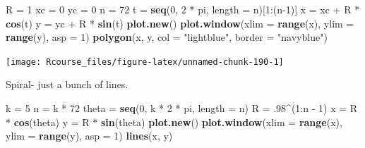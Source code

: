 \documentclass[]{book}
\newenvironment{Shaded}{\begin{snugshade}}{\end{snugshade}}
\newcommand{\KeywordTok}[1]{\textcolor[rgb]{0.13,0.29,0.53}{\textbf{{#1}}}}
\newcommand{\DataTypeTok}[1]{\textcolor[rgb]{0.13,0.29,0.53}{{#1}}}
\newcommand{\DecValTok}[1]{\textcolor[rgb]{0.00,0.00,0.81}{{#1}}}
\newcommand{\StringTok}[1]{\textcolor[rgb]{0.31,0.60,0.02}{{#1}}}
\newcommand{\NormalTok}[1]{{#1}}
\theoremstyle{definition}
\theoremstyle{definition}
\theoremstyle{remark}
\begin{document}
\begin{Shaded}
\begin{Highlighting}[]
\NormalTok{R =}\StringTok{ }\DecValTok{1}
\NormalTok{xc =}\StringTok{ }\DecValTok{0}
\NormalTok{yc =}\StringTok{ }\DecValTok{0}
\NormalTok{n =}\StringTok{ }\DecValTok{72}
\NormalTok{t =}\StringTok{ }\KeywordTok{seq}\NormalTok{(}\DecValTok{0}\NormalTok{, }\DecValTok{2} \NormalTok{*}\StringTok{ }\NormalTok{pi, }\DataTypeTok{length =} \NormalTok{n)[}\DecValTok{1}\NormalTok{:(n}\DecValTok{-1}\NormalTok{)]}
\NormalTok{x =}\StringTok{ }\NormalTok{xc +}\StringTok{ }\NormalTok{R *}\StringTok{ }\KeywordTok{cos}\NormalTok{(t)}
\NormalTok{y =}\StringTok{ }\NormalTok{yc +}\StringTok{ }\NormalTok{R *}\StringTok{ }\KeywordTok{sin}\NormalTok{(t)}
\KeywordTok{plot.new}\NormalTok{()}
\KeywordTok{plot.window}\NormalTok{(}\DataTypeTok{xlim =} \KeywordTok{range}\NormalTok{(x), }\DataTypeTok{ylim =} \KeywordTok{range}\NormalTok{(y), }\DataTypeTok{asp =} \DecValTok{1}\NormalTok{)}
\KeywordTok{polygon}\NormalTok{(x, y, }\DataTypeTok{col =} \StringTok{"lightblue"}\NormalTok{, }\DataTypeTok{border =} \StringTok{"navyblue"}\NormalTok{)}
\end{Highlighting}
\end{Shaded}

\texttt{[image: Rcourse\_files/figure-latex/unnamed-chunk-190-1]}

Spiral- just a bunch of lines.

\begin{Shaded}
\begin{Highlighting}[]
\NormalTok{k =}\StringTok{ }\DecValTok{5}
\NormalTok{n =}\StringTok{ }\NormalTok{k *}\StringTok{ }\DecValTok{72}
\NormalTok{theta =}\StringTok{ }\KeywordTok{seq}\NormalTok{(}\DecValTok{0}\NormalTok{, k *}\StringTok{ }\DecValTok{2} \NormalTok{*}\StringTok{ }\NormalTok{pi, }\DataTypeTok{length =} \NormalTok{n)}
\NormalTok{R =}\StringTok{ }\NormalTok{.}\DecValTok{98}\NormalTok{^(}\DecValTok{1}\NormalTok{:n -}\StringTok{ }\DecValTok{1}\NormalTok{)}
\NormalTok{x =}\StringTok{ }\NormalTok{R *}\StringTok{ }\KeywordTok{cos}\NormalTok{(theta)}
\NormalTok{y =}\StringTok{ }\NormalTok{R *}\StringTok{ }\KeywordTok{sin}\NormalTok{(theta)}
\KeywordTok{plot.new}\NormalTok{()}
\KeywordTok{plot.window}\NormalTok{(}\DataTypeTok{xlim =} \KeywordTok{range}\NormalTok{(x), }\DataTypeTok{ylim =} \KeywordTok{range}\NormalTok{(y), }\DataTypeTok{asp =} \DecValTok{1}\NormalTok{)}
\KeywordTok{lines}\NormalTok{(x, y)}
\end{Highlighting}
\end{Shaded}
\end{document}

